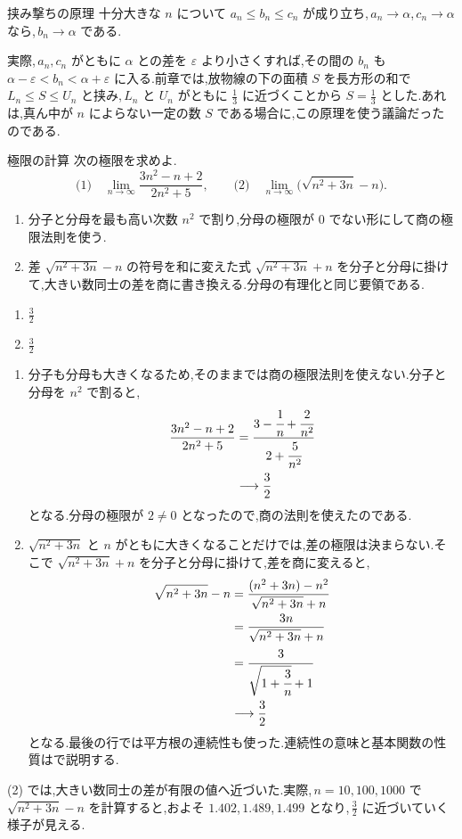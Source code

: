 \begin{theorem}{挟み撃ちの原理}
十分大きな $n$ について $a_n\le b_n\le c_n$ が成り立ち,\,$a_n\to\alpha$,\,$c_n\to\alpha$ なら,\,$b_n\to\alpha$ である.
\end{theorem}

実際,\,$a_n,c_n$ がともに $\alpha$ との差を $\varepsilon$ より小さくすれば,その間の $b_n$ も $\alpha-\varepsilon<b_n<\alpha+\varepsilon$ に入る.前章では,放物線の下の面積 $S$ を長方形の和で $L_n\le S\le U_n$ と挟み,\,$L_n$ と $U_n$ がともに $\frac13$ に近づくことから $S=\frac13$ とした.あれは,真ん中が $n$ によらない一定の数 $S$ である場合に,この原理を使う議論だったのである.

\begin{example}{極限の計算}
次の極限を求めよ.
\[
 \text{(1)}\quad\lim_{n\to\infty}\frac{3n^2-n+2}{2n^2+5},
 \qquad
 \text{(2)}\quad\lim_{n\to\infty}\bigl(\sqrt{n^2+3n}-n\bigr).
\]
\end{example}
\begin{enumerate}[label=(\arabic*)]
 \item 分子と分母を最も高い次数 $n^2$ で割り,分母の極限が $0$ でない形にして商の極限法則を使う.
 \item 差 $\sqrt{n^2+3n}-n$ の符号を和に変えた式 $\sqrt{n^2+3n}+n$ を分子と分母に掛けて,大きい数同士の差を商に書き換える.分母の有理化と同じ要領である.
\end{enumerate}
\begin{enumerate}[label=(\arabic*)]
 \item $\frac32$
 \item $\frac32$
\end{enumerate}
\begin{enumerate}[label=(\arabic*)]
 \item 分子も分母も大きくなるため,そのままでは商の極限法則を使えない.分子と分母を $n^2$ で割ると,
 \begin{align*}
  \frac{3n^2-n+2}{2n^2+5}
  &=\cfrac{3-\cfrac1n+\cfrac2{n^2}}{2+\cfrac5{n^2}}\\
  &\longrightarrow\frac32
 \end{align*}
 となる.分母の極限が $2\ne0$ となったので,商の法則を使えたのである.
 \item $\sqrt{n^2+3n}$ と $n$ がともに大きくなることだけでは,差の極限は決まらない.そこで $\sqrt{n^2+3n}+n$ を分子と分母に掛けて,差を商に変えると,
 \begin{align*}
  \sqrt{n^2+3n}-n
  &=\frac{(n^2+3n)-n^2}{\sqrt{n^2+3n}+n}\\
  &=\frac{3n}{\sqrt{n^2+3n}+n}\\
  &=\cfrac3{\sqrt{1+\cfrac3n}+1}\\
  &\longrightarrow\frac32
 \end{align*}
 となる.最後の行では平方根の連続性も使った.連続性の意味と基本関数の性質はで説明する.
\end{enumerate}
(2) では,大きい数同士の差が有限の値へ近づいた.実際,\,$n=10,100,1000$ で $\sqrt{n^2+3n}-n$ を計算すると,およそ $1.402$,\,$1.489$,\,$1.499$ となり,\,$\frac32$ に近づいていく様子が見える.

%
